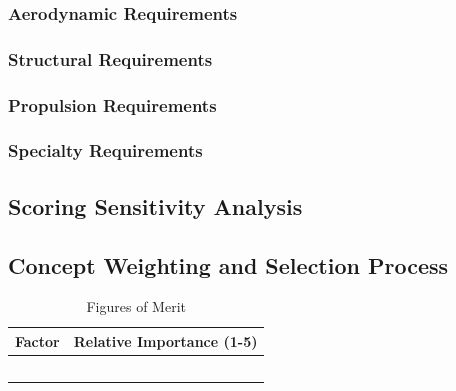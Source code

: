 \documentclass[report]{byu-aero}
\begin{document}
\subsubsection{Aerodynamic Requirements}
\label{sssec:aeroreqs}


\subsubsection{Structural Requirements}
\label{sssec:structreqs}


\subsubsection{Propulsion Requirements}
\label{sssec:propreqs}


\subsubsection{Specialty Requirements} %
\label{sssec:specialreqs}



\subsection{Scoring Sensitivity Analysis}
\label{ssec:scoringsensitivity}



\subsection{Concept Weighting and Selection Process}
\label{ssec:selectionprocess}


\begin{table}[h!]
	\centering
	\caption{Figures of Merit}
	\label{tab:fom}
	\begin{tabular}{ |c|c| } 
		\hline
		\rowcolor{BYUbluemid}
    	Factor & Relative Importance (1-5) \\ 
		\hline
	     &  \\ 
		\hline
		 &  \\ 
		\hline
		 &  \\ 
		\hline
		 &  \\ 
		\hline
		 &  \\ 
		\hline
	\end{tabular}
\end{table}
\end{document}
